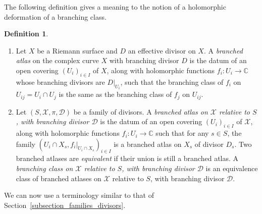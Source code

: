 \documentclass[JEP,XML,SOM,Unicode,NoEqCountersInSection,published]{cedram}
\theoremstyle{definition}
\newtheorem{definition}{Definition}[subsection]
\theoremstyle{plain}
\begin{document}
The following definition gives a meaning to the notion of a holomorphic deformation of a branching class.

\skpt
\begin{definition}\label{definition_branched_atlas}
\begin{enumerate}
\item
Let $X$ be a Riemann surface and $D$ an effective divisor on $X$.
A \emph{branched atlas} on the complex curve $X$ with branching divisor $D$ is the datum of an open covering $(U_i)_{i \in I}$ of $X$, along with holomorphic functions $f_i: U_i \to \mathbb C$ whose branching divisors are $D|_{U_i}$, such that the branching class of $f_i$ on $U_{ij} = U_i \cap U_j$ is the same as the branching class of $f_j$ on $U_{ij}$.
\item
Let $(S, \mathcal X, \pi, \mathcal D)$ be a family of divisors.
A \emph{branched atlas on $\mathcal X$ relative to $S$, with branching divisor $\mathcal D$} is the datum of an open covering $(U_i)_{i \in I}$ of $\mathcal X$, along with holomorphic functions $f_i: U_i \to \mathbb C$ such that for any $s \in S$, the family $(U_i \cap X_s, f_i|_{U_i \cap X_s})_{i \in I}$ is a branched atlas on $X_s$ of divisor $D_s$.
Two branched atlases are \emph{equivalent} if their union is still a branched atlas.
A \emph{branching class on $\mathcal X$ relative to $S$, with branching divisor $\mathcal D$} is an equivalence class of branched atlases on $\mathcal X$ relative to $S$, with branching divisor $\mathcal D$.
\end{enumerate}
\end{definition}

\enlargethispage{-\baselineskip}%
We can now use a terminology similar to that of Section~\ref{subsection_families_divisors}.
\end{document}
